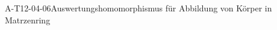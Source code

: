 
\begin{EXA}{A-T12-04-06}{Auswertungshomomorphismus für Abbildung von Körper in Matrzenring}
\end{EXA}
